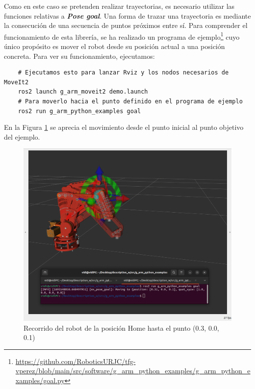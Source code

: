 Como en este caso se pretenden realizar trayectorias, es necesario utilizar las funciones relativas a \textbf{\textit{Pose goal}}. Una forma de trazar una 
trayectoria es mediante la consecución de una secuencia de puntos próximos entre sí. 
\newpage
Para comprender el funcionamiento de esta librería, se ha realizado un programa de ejemplo\footnote{\url{https://github.com/RoboticsURJC/tfg-vperez/blob/main/src/software/g\_arm\_python_examples/g\_arm_python\_examples/goal.py}} 
cuyo único propósito es mover el robot desde su posición actual a una posición concreta. Para ver su funcionamiento, ejecutamos: 
\begin{verbatim}
    # Ejecutamos esto para lanzar Rviz y los nodos necesarios de MoveIt2
    ros2 launch g_arm_moveit2 demo.launch 
    # Para moverlo hacia el punto definido en el programa de ejemplo
    ros2 run g_arm_python_examples goal 
\end{verbatim}
En la Figura \ref{fig:goal} se aprecia el movimiento desde el punto inicial al punto objetivo del ejemplo.
\begin{figure} [ht!]
    \begin{center}
        \includegraphics[width=14cm]{figs/examples_goal.png}
    \end{center}
    \caption{Recorrido del robot de la posición Home hasta el punto (0.3, 0.0, 0.1)}
\label{fig:goal}
\end{figure}

\newpage


